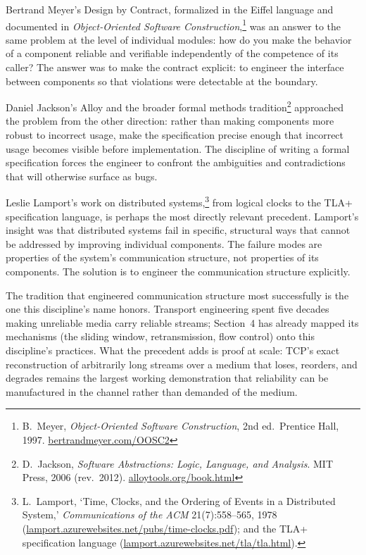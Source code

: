\documentclass[11pt, a4paper]{article}
\begin{document}
Bertrand Meyer's Design by
Contract, formalized in the Eiffel language and documented in \textit{Object-Oriented
Software
Construction},\footnote{B.~Meyer, \emph{Object-Oriented Software Construction}, 2nd ed.\ Prentice Hall,
1997. \href{https://bertrandmeyer.com/OOSC2/}{bertrandmeyer.com/OOSC2}} was
an answer to the same problem at the level of individual modules: how do you make the
behavior of a component reliable and verifiable independently of the competence of its
caller? The answer was to make the contract explicit: to engineer the interface between
components so that violations were detectable at the boundary.

Daniel Jackson's Alloy and the broader formal methods
tradition\footnote{D.~Jackson, \emph{Software Abstractions: Logic, Language, and Analysis}. MIT
Press, 2006 (rev.\ 2012). \href{https://alloytools.org/book.html}{alloytools.org/book.html}}
approached the problem from the other direction: rather than making components more
robust to incorrect usage, make the specification precise enough that incorrect usage
becomes visible before implementation. The discipline of writing a formal specification
forces the engineer to confront the ambiguities and contradictions that will otherwise
surface as bugs.

Leslie Lamport's work on distributed
systems,\footnote{L.~Lamport, `Time, Clocks, and the Ordering of Events in a Distributed System,'
\emph{Communications of the ACM} 21(7):558--565, 1978
(\href{https://lamport.azurewebsites.net/pubs/time-clocks.pdf}{lamport.azurewebsites.net/pubs/time-clocks.pdf});
and the TLA+ specification language
(\href{https://lamport.azurewebsites.net/tla/tla.html}{lamport.azurewebsites.net/tla/tla.html}).} from
logical clocks to the TLA+ specification language, is perhaps the most directly relevant
precedent. Lamport's insight was that distributed systems fail in specific, structural
ways that cannot be addressed by improving individual components. The failure modes are
properties of the system's communication structure, not properties of its components. The
solution is to engineer the communication structure explicitly.

The tradition that engineered communication structure most successfully is the one this
discipline's name honors. Transport engineering spent five decades making unreliable
media carry reliable streams; Section~4 has already mapped its mechanisms (the sliding
window, retransmission, flow control) onto this discipline's practices. What the
precedent adds is proof at scale: TCP's exact reconstruction of arbitrarily long streams
over a medium that loses, reorders, and degrades remains the largest working
demonstration that reliability can be manufactured in the channel rather than demanded
of the medium.
\end{document}
